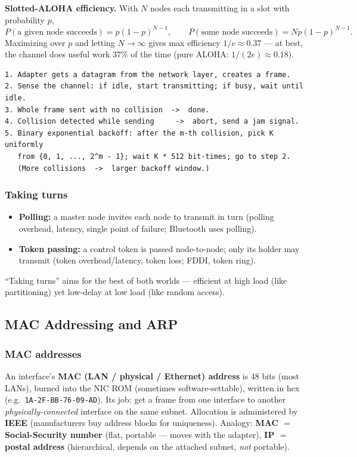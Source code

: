 \documentclass[hidelinks]{article}
\begin{document}
\textbf{Slotted-ALOHA efficiency.} With $N$ nodes each transmitting in a slot
with probability $p$,
\[
    P(\text{a given node succeeds})=p(1-p)^{N-1},\qquad
    P(\text{some node succeeds})=Np(1-p)^{N-1}.
\]
Maximizing over $p$ and letting $N\to\infty$ gives max efficiency
$1/e\approx 0.37$ --- at best, the channel does useful work 37\% of the time
(pure ALOHA: $1/(2e)\approx 0.18$).

\begin{lstlisting}[caption={Ethernet CSMA/CD with binary exponential backoff}]
1. Adapter gets a datagram from the network layer, creates a frame.
2. Sense the channel: if idle, start transmitting; if busy, wait until idle.
3. Whole frame sent with no collision  ->  done.
4. Collision detected while sending     ->  abort, send a jam signal.
5. Binary exponential backoff: after the m-th collision, pick K uniformly
   from {0, 1, ..., 2^m - 1}; wait K * 512 bit-times; go to step 2.
   (More collisions  ->  larger backoff window.)
\end{lstlisting}

\subsubsection{Taking turns}
\begin{itemize}
    \item \textbf{Polling:} a master node invites each node to transmit in turn
    (polling overhead, latency, single point of failure; Bluetooth uses
    polling).
    \item \textbf{Token passing:} a control token is passed node-to-node; only
    its holder may transmit (token overhead/latency, token loss; FDDI, token
    ring).
\end{itemize}
``Taking turns'' aims for the best of both worlds --- efficient at high load
(like partitioning) yet low-delay at low load (like random access).

\subsection{MAC Addressing and ARP}

\subsubsection{MAC addresses}
An interface's \textbf{MAC (LAN / physical / Ethernet) address} is 48 bits
(most LANs), burned into the NIC ROM (sometimes software-settable), written in
hex (e.g.\ \texttt{1A-2F-BB-76-09-AD}). Its job: get a frame from one interface
to another \emph{physically-connected} interface on the same subnet. Allocation
is administered by \textbf{IEEE} (manufacturers buy address blocks for
uniqueness). Analogy: \textbf{MAC $=$ Social-Security number} (flat, portable
--- moves with the adapter), \textbf{IP $=$ postal address} (hierarchical,
depends on the attached subnet, \emph{not} portable).
\end{document}
